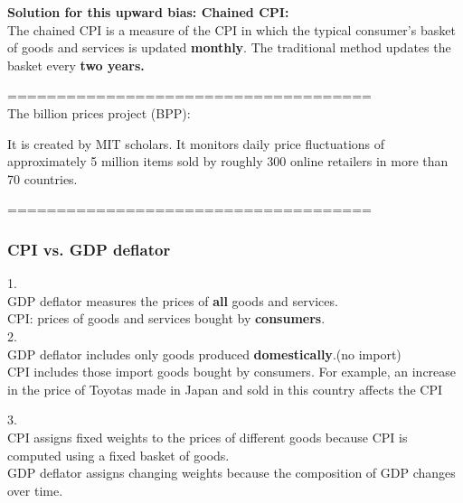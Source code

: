 \documentclass[12pt]{article}
\begin{document}
{\textbf {Solution for this upward bias: Chained CPI:}}\\
The chained CPI is a measure of the CPI in which the typical consumer's basket of
goods and services is updated {\textbf {monthly}}. The traditional method updates
the basket every {\textbf {two years.}}


=====================================\\
The billion prices project (BPP):

It is created by MIT scholars. It monitors daily price fluctuations of approximately 5 
million items sold by roughly 300 online retailers in more than 70 countries.

=====================================\\














\subsubsection{CPI vs. GDP deflator}

1.\\
GDP deflator measures the prices of {\textbf {all}} goods and services. \\
CPI: prices of goods and services bought by {\textbf {consumers}}.\\


2.\\
GDP deflator includes only goods produced {\textbf {domestically}}.(no import)\\
CPI includes those import goods bought by consumers.
For example, an increase in the price of Toyotas made in Japan and sold in this 
country affects the CPI


3.\\
CPI assigns fixed weights to the prices of different goods because CPI is computed using
a fixed basket of goods.\\
GDP deflator assigns changing weights because the composition of GDP changes over time.


\noindent{}\\
\end{document}
